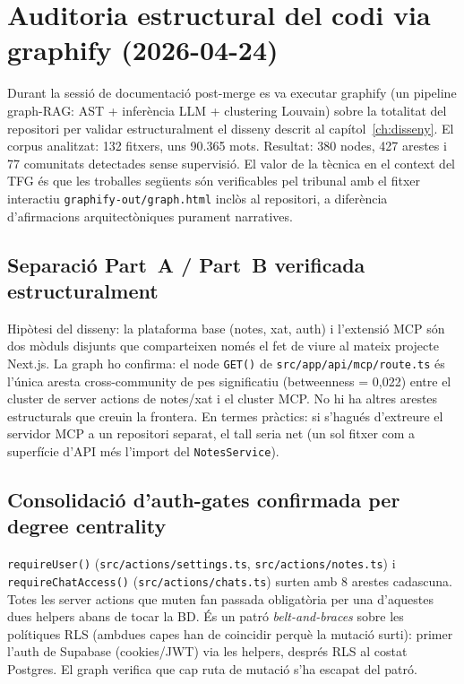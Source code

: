 \section{Auditoria estructural del codi via graphify (2026-04-24)}
\label{sec:graphify-audit}

Durant la sessió de documentació post-merge es va executar graphify (un pipeline graph-RAG: AST + inferència LLM + clustering Louvain) sobre la totalitat del repositori per validar estructuralment el disseny descrit al capítol~\ref{ch:disseny}. El corpus analitzat: 132 fitxers, uns 90.365 mots. Resultat: 380 nodes, 427 arestes i 77 comunitats detectades sense supervisió. El valor de la tècnica en el context del TFG és que les troballes següents són verificables pel tribunal amb el fitxer interactiu \texttt{graphify-out/graph.html} inclòs al repositori, a diferència d'afirmacions arquitectòniques purament narratives.

\subsection{Separació Part~A / Part~B verificada estructuralment}
Hipòtesi del disseny: la plataforma base (notes, xat, auth) i l'extensió MCP són dos mòduls disjunts que comparteixen només el fet de viure al mateix projecte Next.js. La graph ho confirma: el node \texttt{GET()} de \texttt{src/app/api/mcp/route.ts} és l'única aresta cross-community de pes significatiu (betweenness = 0,022) entre el cluster de server actions de notes/xat i el cluster MCP. No hi ha altres arestes estructurals que creuin la frontera. En termes pràctics: si s'hagués d'extreure el servidor MCP a un repositori separat, el tall seria net (un sol fitxer com a superfície d'API més l'import del \texttt{NotesService}).

\subsection{Consolidació d'auth-gates confirmada per degree centrality}
\texttt{requireUser()} (\texttt{src/actions/settings.ts}, \texttt{src/actions/notes.ts}) i \texttt{requireChatAccess()} (\texttt{src/actions/chats.ts}) surten amb 8 arestes cadascuna. Totes les server actions que muten fan passada obligatòria per una d'aquestes dues helpers abans de tocar la BD. És un patró \emph{belt-and-braces} sobre les polítiques RLS (ambdues capes han de coincidir perquè la mutació surti): primer l'auth de Supabase (cookies/JWT) via les helpers, després RLS al costat Postgres. El graph verifica que cap ruta de mutació s'ha escapat del patró.

